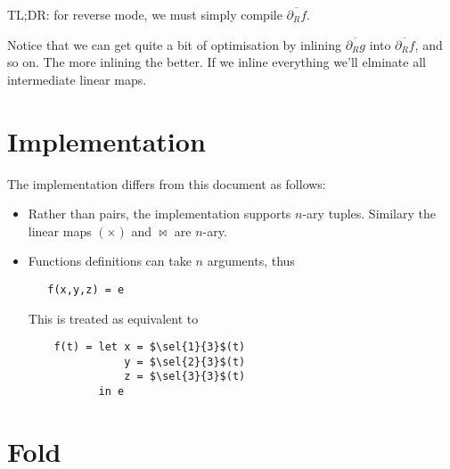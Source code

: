\documentclass[sigplan,review]{acmart}
\newcommand{\deriv}{\partial}  %
\newcommand{\gradft}[1]{\deriv_R#1}  %
\newcommand{\ogradft}[1]{\overline{\gradft{#1}}}  %
\newcommand{\sel}[2]{\pi_{#1,#2}}
\newcommand{\lmvcat}{\times}         %
\newcommand{\lmhcat}{\bowtie}        %
\begin{document}
TL;DR: for reverse mode, we must simply compile $\ogradft{f}$.

Notice that we can get quite a bit of optimisation by inlining $\ogradft{g}$ into $\ogradft{f}$,
and so on. The more inlining the better.  If we inline everything we'll elminate
all intermediate linear maps.


\section{Implementation}

The implementation differs from this document as follows:
\begin{itemize}
\item Rather than pairs, the implementation supports $n$-ary tuples.
  Similary the linear maps $(\lmvcat)$ and $\lmhcat$ are $n$-ary.
\item Functions definitions can take $n$ arguments, thus
  \begin{lstlisting}
   f(x,y,z) = e
  \end{lstlisting}
  This is treated as equivalent to
  \begin{lstlisting}
    f(t) = let x = $\sel{1}{3}$(t)
               y = $\sel{2}{3}$(t)
               z = $\sel{3}{3}$(t)
           in e
  \end{lstlisting}
\end{itemize}

\section{Fold}
\end{document}
